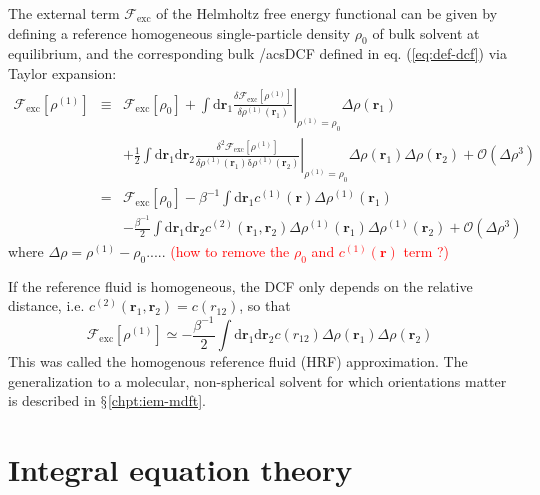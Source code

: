 The external term $\mathcal{F}_{\mathrm{exc}}$ of the Helmholtz free
energy functional can be given by defining a reference homogeneous
single-particle density $\rho_{0}$ of bulk solvent at equilibrium,
and the corresponding bulk /acs{DCF} defined in eq. (\ref{eq:def-dcf})
via Taylor expansion:
\begin{eqnarray}
\mathcal{F}_{\mathrm{exc}}\left[\rho^{(1)}\right] & \equiv & \mathcal{F}_{\mathrm{exc}}\left[\rho_{0}\right]+\int\mathrm{d}\mathbf{r}_{1}\left.\frac{\delta\mathcal{F}_{\mathrm{exc}}\left[\rho^{(1)}\right]}{\delta\rho^{(1)}(\mathbf{r}_{1})}\right|_{\rho^{(1)}=\rho_{0}}\Delta\rho(\mathbf{r}_{1})\nonumber \\
 &  & +\frac{1}{2}\int\mathrm{d}\mathbf{\mathbf{r}}_{1}\mathrm{d}\mathbf{r}_{2}\left.\frac{\delta^{2}\mathcal{F}_{\mathrm{exc}}\left[\rho^{(1)}\right]}{\delta\rho^{(1)}(\mathbf{r}_{1})\mathrm{\delta}\rho^{(1)}(\mathbf{r}_{2})}\right|_{\rho^{(1)}=\rho_{0}}\Delta\rho(\mathbf{r}_{1})\Delta\rho(\mathbf{r}_{2})+\mathcal{O}(\Delta\rho^{3})\\
 & = & \mathcal{F}_{\mathrm{exc}}\left[\rho_{0}\right]-\beta^{-1}\int\mathrm{d}\mathbf{r}_{1}c^{(1)}(\mathbf{r})\Delta\rho^{(1)}(\mathbf{r}_{1})\nonumber \\
 &  & -\frac{\beta^{-1}}{2}\int\mathrm{d}\mathbf{\mathbf{r}}_{1}\mathrm{d}\mathbf{r}_{2}c^{(2)}(\mathbf{r}_{1},\mathbf{r}_{2})\Delta\rho^{(1)}(\mathbf{r}_{1})\Delta\rho^{(1)}(\mathbf{r}_{2})+\mathcal{O}(\Delta\rho{}^{3})
\end{eqnarray}
where $\Delta\rho=\rho^{(1)}-\rho_{0}$.....\textcolor{red}{{} (how
to remove the $\rho_{0}$ and $c^{(1)}(\mathbf{r})$ term ?)}

If the reference fluid is homogeneous, the DCF only depends on the
relative distance, i.e. $c^{(2)}(\mathbf{r}_{1},\mathbf{r}_{2})=c(r_{12})$,
so that
\begin{equation}
\mathcal{F}_{\mathrm{exc}}\left[\rho^{(1)}\right]\simeq-\frac{\beta^{-1}}{2}\int\mathrm{d}\mathbf{\mathbf{r}}_{1}\mathrm{d}\mathbf{r}_{2}c(r_{12})\Delta\rho(\mathbf{r}_{1})\Delta\rho(\mathbf{r}_{2})
\end{equation}
This was called the homogenous reference fluid (\acs{HRF}) approximation.
The generalization to a molecular, non-spherical solvent for which
orientations matter is described in $\mathsection$\ref{chpt:iem-mdft}.

\section{Integral equation theory}

